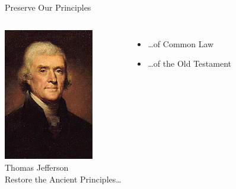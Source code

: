 \documentclass{beamer}
\begin{document}
\begin{frame}{Preserve Our Principles}
    \begin{columns}[onlytextwidth]
            \centering
            \includegraphics[width=0.75\textwidth]{img/jefferson.png} \\
            Thomas Jefferson \\

            Restore the Ancient Principles\ldots
            \begin{itemize}
                \item \ldots of Common Law
                \item \ldots of the Old Testament
            \end{itemize}
    \end{columns}
\end{frame}
\end{document}
